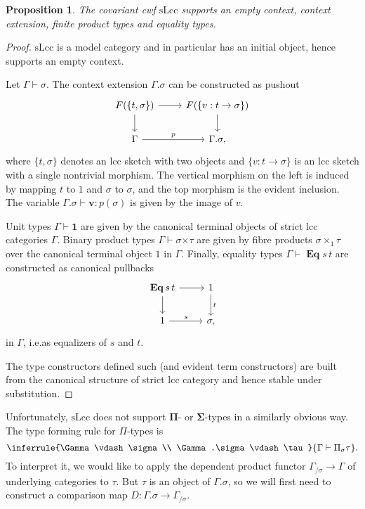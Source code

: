 \documentclass{article}
\newtheorem{proposition}{Proposition}
\theoremstyle{remark}
\theoremstyle{definition}
\begin{document}
\begin{proposition}
  The covariant cwf $\mathrm{sLcc}$ supports an empty context, context extension, finite product types and equality types.
\end{proposition}
\begin{proof}
  $\mathrm{sLcc}$ is a model category and in particular has an initial object, hence supports an empty context.
  
  Let $\Gamma \vdash \sigma$.
  The context extension $\Gamma.\sigma$ can be constructed as pushout
  \begin{equation}
    \begin{tikzcd}
      F(\{ t, \sigma \}) \arrow[d] \arrow[r] & F(\{ v : t \rightarrow \sigma \}) \arrow[d] \\
      \Gamma \arrow[r, "p"] & \Gamma.\sigma,
    \end{tikzcd}
  \end{equation}
  where $\{ t, \sigma \}$ denotes an lcc sketch with two objects and $\{ v : t \rightarrow \sigma \}$ is an lcc sketch with a single nontrivial morphism.
  The vertical morphism on the left is induced by mapping $t$ to $1$ and $\sigma$ to $\sigma$, and the top morphism is the evident inclusion.
  The variable $\Gamma.\sigma \vdash \mathbf{v} : p(\sigma)$ is given by the image of $v$.

  Unit types $\Gamma \vdash \mathbf{1}$ are given by the canonical terminal objects of strict lcc categories $\Gamma$.
  Binary product types $\Gamma \vdash \sigma \mathbf{\times} \tau$ are given by fibre products $\sigma \times_1 \tau$ over the canonical terminal object $1$ in $\Gamma$.
  Finally, equality types $\Gamma \vdash \operatorname{\mathbf{Eq}} s \, t$ are constructed as canonical pullbacks
  \begin{equation}
    \label{eq:slcc-context-extension}
    \begin{tikzcd}
      \operatorname{\mathbf{Eq}} s \, t \arrow[r] \arrow[d] & 1 \arrow[d, "t"] \\
      1 \arrow[r, "s"] & \sigma,
    \end{tikzcd}
  \end{equation}
  in $\Gamma$, i.e.\@ as equalizers of $s$ and $t$.

  The type constructors defined such (and evident term constructors) are built from the canonical structure of strict lcc category and hence stable under substitution.
\end{proof}

Unfortunately, $\mathrm{sLcc}$ does not support $\mathbf{\Pi}$- or $\mathbf{\Sigma}$-types in a similarly obvious way.
The type forming rule for $\Pi$-types is
\begin{equation}
  \inferrule
  {\Gamma \vdash \sigma \\ \Gamma.\sigma \vdash \tau}
  {\Gamma \vdash \Pi_\sigma \tau}.
\end{equation}
To interpret it, we would like to apply the dependent product functor $\Gamma_{/ \sigma} \rightarrow \Gamma$ of underlying categories to $\tau$.
But $\tau$ is an object of $\Gamma.\sigma$, so we will first need to construct a comparison map $D : \Gamma.\sigma \rightarrow \Gamma_{/ \sigma}$.
\end{document}
